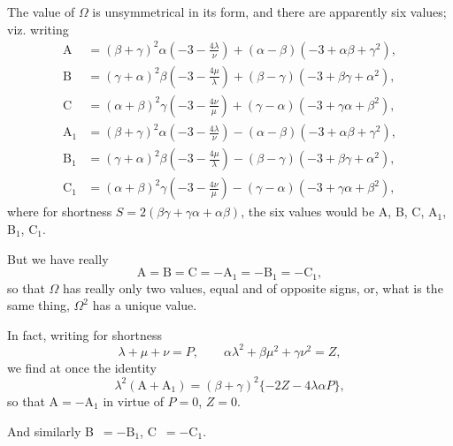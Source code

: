 \documentclass[12pt,a4paper]{article}
\theoremstyle{plain}
\begin{document}
\newpage
\setcounter{page}{110}

The value of $\Omega$ is unsymmetrical in its form, and there are apparently six values; viz. writing
\begin{align*}
\text{A} &= (\beta + \gamma)^{2}\alpha(-3 - \tfrac{4\lambda}{\nu}) + (\alpha - \beta)(-3 + \alpha\beta + \gamma^{2}), \\
\text{B} &= (\gamma + \alpha)^{2}\beta(-3 - \tfrac{4\mu}{\lambda}) + (\beta - \gamma)(-3 + \beta\gamma + \alpha^{2}), \\
\text{C} &= (\alpha + \beta)^{2}\gamma(-3 - \tfrac{4\nu}{\mu}) + (\gamma - \alpha)(-3 + \gamma\alpha + \beta^{2}), \\
\text{A}_{1} &= (\beta + \gamma)^{2}\alpha(-3 - \tfrac{4\lambda}{\nu}) - (\alpha - \beta)(-3 + \alpha\beta + \gamma^{2}), \\
\text{B}_{1} &= (\gamma + \alpha)^{2}\beta(-3 - \tfrac{4\mu}{\lambda}) - (\beta - \gamma)(-3 + \beta\gamma + \alpha^{2}), \\
\text{C}_{1} &= (\alpha + \beta)^{2}\gamma(-3 - \tfrac{4\nu}{\mu}) - (\gamma - \alpha)(-3 + \gamma\alpha + \beta^{2}),
\end{align*}
where for shortness $S = 2(\beta\gamma + \gamma\alpha + \alpha\beta)$, the six values would be A, B, C, A$_{1}$, B$_{1}$, C$_{1}$.

But we have really
\[
\text{A} = \text{B} = \text{C} = -\text{A}_{1} = -\text{B}_{1} = -\text{C}_{1},
\]
so that $\Omega$ has really only two values, equal and of opposite signs, or, what is the same thing, $\Omega^{2}$ has a unique value.

In fact, writing for shortness
\[
\lambda + \mu + \nu = P, \qquad \alpha\lambda^{2} + \beta\mu^{2} + \gamma\nu^{2} = Z,
\]
we find at once the identity
\[
\lambda^{2}(\text{A} + \text{A}_{1}) = (\beta + \gamma)^{2}\{-2Z - 4\lambda\alpha P\},
\]
so that $\text{A} = -\text{A}_{1}$ in virtue of $P=0$, $Z=0$.

And similarly B~$= -\text{B}_{1}$, C~$= -\text{C}_{1}$.
\end{document}
